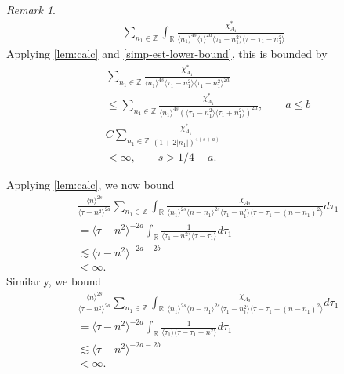 \documentclass[12pt,reqno]{amsart}
\numberwithin{equation}{section}  %
\numberwithin{figure}{section}
\newcommand{\rr}{\mathbb{R}}
\newcommand{\zz}{\mathbb{Z}}
\theoremstyle{plain}
\theoremstyle{definition}
\theoremstyle{remark}
\newtheorem{remark}{Remark}
\begin{document}
\begin{framed}
\begin{remark}
\begin{equation*}
\begin{split}
  \sum_{n_{1} \in \zz} \int_{\rr} \frac{\chi^{*}_{A_{1}}}{\langle n_{1} \rangle
  ^{4s} \langle \tau \rangle ^{2a} \langle \tau_{1} - n_{1}^{2} \rangle
   \langle \tau - \tau_{1} - n_{1}^{2} \rangle }
\end{split}
\end{equation*}
Applying \autoref{lem:calc} and \eqref{simp-est-lower-bound}, this is bounded by
%
\begin{equation*}
\begin{split}
  & \sum_{n_{1} \in \zz} \frac{\chi^{*}_{A_{1}}}{\langle n_{1} \rangle ^{4s} \langle
  \tau_{1} - n_{1}^{2} \rangle  \langle \tau_{1} + n_{1}^{2} \rangle
  ^{2a}}
  \\
  & \le \sum_{n_{1} \in \zz} \frac{\chi^{*}_{A_{1}}}{\langle n_{1} \rangle ^{4s}
  (\langle
  \tau_{1} - n_{1}^{2} \rangle \langle \tau_{1} + n_{1}^{2} \rangle )
  ^{2a}}, \qquad a \le b
  \\
  & C \sum_{n_{1} \in \zz}  \frac{\chi_{A_{1}}^{*}}{(1 + 2| n_{1} | )
  ^{4(s + a )}}
  \\
  & < \infty, \qquad s > 1/4 - a.
\end{split}
\end{equation*}
%
%
%
\end{remark}
\end{framed}
%
Applying \autoref{lem:calc}, we now bound 
\begin{equation*}
  \begin{split}
    & \frac{ \langle n
    \rangle ^{2s}}{\langle \tau - n^{2} \rangle ^{2a}}
    \sum_{n_{1} \in \zz} \int_{\rr} \frac{\chi_{A_{2}}}{ \langle n_{1} \rangle ^{2s} \langle n-n_{1} \rangle ^{2s} 
    \langle \tau_{1} - n_{1}^{2} \rangle \langle  \tau - \tau_{1} -
    (n - n_{1})^{2} \rangle }
    d \tau_1 
    \\
    & = 
   \langle \tau -n^{2} \rangle ^{-2a}\int_{\rr} \frac{1}{\langle \tau_{1} -
  n^{2} \rangle \langle
  \tau - \tau_{1}\rangle }d \tau_{1}
  \\
  & \lesssim 
  \langle \tau - n^{2} \rangle ^{-2a-2b} 
  \\
  & < \infty.
\end{split}
\end{equation*}
%
%
Similarly, we bound
%
%
\begin{equation}
\begin{split}
  & \frac{ \langle n
    \rangle ^{2s}}{\langle \tau - n^{2} \rangle ^{2a}}
    \sum_{n_{1} \in \zz} \int_{\rr} \frac{\chi_{A_{3}}}{ \langle n_{1} \rangle ^{2s} \langle n-n_{1} \rangle ^{2s} 
    \langle \tau_{1} - n_{1}^{2} \rangle \langle  \tau - \tau_{1} -
    (n - n_{1})^{2} \rangle }
    d \tau_1 
    \\
  & = \langle \tau - n^{2} \rangle ^{-2a}
  \int_{\rr} \frac{1}{ \langle \tau_{1} \rangle  \langle \tau -
  \tau_{1} - n^{2} \rangle}
d \tau_1 
\\
  & \lesssim   \langle \tau - n^{2} \rangle ^{-2a-2b} 
  \\
  & < \infty.
	\end{split}
\end{equation}
\end{document}

